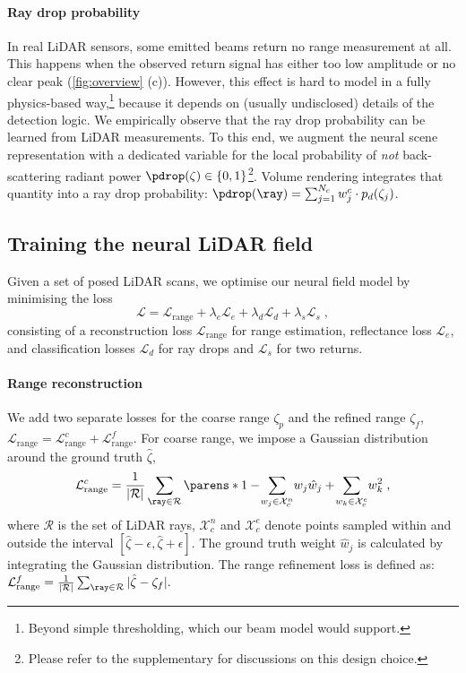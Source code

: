 \paragraph{Ray drop probability}
In real LiDAR sensors, some emitted beams return no range measurement at all. This happens when the observed return signal has either too low amplitude or no clear peak (\cref{fig:overview} (c)). However, this effect is hard to model in a fully physics-based way,\footnote{Beyond simple thresholding, which our beam model would support.} because it depends on (usually undisclosed) details of the detection logic. We empirically observe that the ray drop probability can be learned from LiDAR measurements. To this end, we augment the neural scene representation with a dedicated variable for the local probability of \textit{not} back-scattering radiant power $\pdrop(\zeta) \in \{0, 1\}$\footnote{Please refer to the supplementary for discussions on this design choice.}. 
Volume rendering integrates that quantity into a ray drop probability: $\pdrop(\ray) = \sum_{j=1}^{N_c} w_j^c\cdot p_d(\zeta_j)$.


\subsection{Training the neural LiDAR field}
\label{sec:opt}
Given a set of posed LiDAR scans, we optimise our neural field model by minimising the loss
\begin{equation}
    \mathcal{L} = \mathcal{L}_{\text{range}} + \lambda_e \mathcal{L}_{e} + \lambda_d \mathcal{L}_{d} + \lambda_s\mathcal{L}_s\;,
\label{eq:loss}
\end{equation}
consisting of a reconstruction loss $\mathcal{L}_{\text{range}}$ for range estimation, reflectance loss $\mathcal{L}_{e}$, and classification losses $\mathcal{L}_{d}$ for ray drops and $\mathcal{L}_s$ for two returns. 


\paragraph{Range reconstruction}
We add two separate losses for the coarse range $\zeta_p$ and the refined range $\zeta_f$, $\mathcal{L}_{\text{range}} = \mathcal{L}_{\text{range}}^c + \mathcal{L}_{\text{range}}^f$. For coarse range, we impose a Gaussian distribution~\cite{rematas2021urban} around the ground truth $\hat{\zeta}$, 
\begin{equation}
    \mathcal{L}_{\text{range}}^c = \frac{1}{|\mathcal{R}|} \sum_{\ray \in \mathcal{R}} \parens*{1-\!\sum_{w_j \in \mathcal{X}_c^n}\!w_j \hat{w}_j+\!\sum_{w_k \in \mathcal{X}_c^e}\!w_k^2}\;,
\end{equation}
where $\mathcal{R}$ is the set of LiDAR rays, $\mathcal{X}_c^n$ and $\mathcal{X}_c^e$ denote points sampled within and outside the interval $[\hat{\zeta}-\epsilon,\hat{\zeta}+\epsilon]$. The ground truth weight $\hat{w}_j$ is calculated by integrating the Gaussian distribution.
The range refinement loss is defined as: $\mathcal{L}_{\text{range}}^f = \frac{1}{|\mathcal{R}|} \sum_{\ray \in \mathcal{R}} |\hat{\zeta} - \zeta_f|.$


